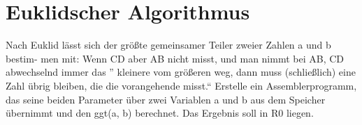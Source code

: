 \documentclass{lehramt-informatik-aufgabe}
\begin{document}
\section{Euklidscher Algorithmus}

Nach Euklid lässt sich der größte gemeinsamer Teiler zweier Zahlen a und b bestim-
men mit:
Wenn CD aber AB nicht misst, und man nimmt bei AB, CD abwechselnd immer das
”
kleinere vom größeren weg, dann muss (schließlich) eine Zahl übrig bleiben, die die
vorangehende misst.“
Erstelle ein Assemblerprogramm, das seine beiden Parameter über zwei Variablen a
und b aus dem Speicher übernimmt und den ggt(a, b) berechnet. Das Ergebnis soll in
R0 liegen.
\end{document}
